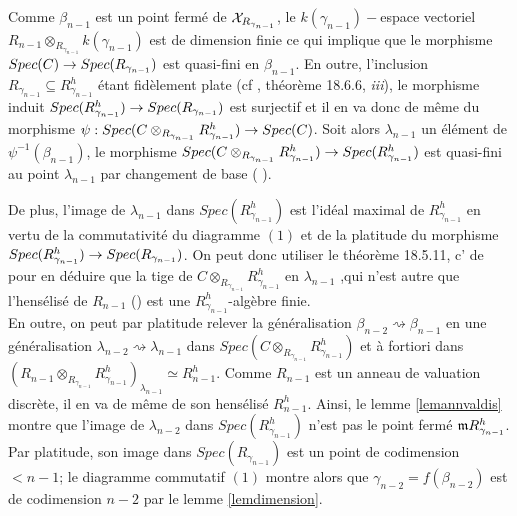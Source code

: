 \documentclass[11pt]{article}
\begin{document}
\begin{itemize}
Comme $\beta_{n-1}$ est un point fermé de $\mathcal{X}_{R_{\gamma_{n-1}}}$, le $k(\gamma_{n-1})-$espace vectoriel $R_{n-1} \otimes_{R_{\gamma_{n-1}}} k(\gamma_{n-1})$ est de dimension finie ce qui implique que le morphisme $Spec(C) \rightarrow Spec(R_{\gamma_{n-1}})$ est quasi-fini en $\beta_{n-1}$. En outre, l'inclusion $R_{\gamma_{n-1}} \subseteq R_{\gamma_{n-1}}^h$ étant fidèlement plate (cf \cite{PMIHES_1967__32__5_0}, théorème 18.6.6, \textit{iii}), le morphisme induit $Spec(R_{\gamma_{n-1}}^h) \rightarrow Spec(R_{\gamma_{n-1}})$ est surjectif et il en va donc de même du morphisme $\psi : Spec(C \otimes_{R_{\gamma_{n-1}}} R_{\gamma_{n-1}}^h) \rightarrow Spec(C)$. Soit alors $\lambda_{n-1}$ un élément de $\psi^{-1}(\beta_{n-1})$, le morphisme $Spec(C \otimes_{R_{\gamma_{n-1}}} R_{\gamma_{n-1}}^h) \rightarrow Spec(R_{\gamma_{n-1}}^h)$ est quasi-fini au point $\lambda_{n-1}$ par changement de base ( \cite[\href{https://stacks.math.columbia.edu/tag/00PP}{Tag 00PP}]{stacks-project}).

De plus, l'image de $\lambda_{n-1}$ dans $Spec(R_{\gamma_{n-1}}^h)$ est l'idéal maximal de $R_{\gamma_{n-1}}^h $ en vertu de la commutativité du diagramme $(1)$ et de la platitude du morphisme $Spec(R_{\gamma_{n-1}}^h) \rightarrow Spec(R_{\gamma_{n-1}})$. On peut donc utiliser le théorème 18.5.11, c' de \cite{PMIHES_1967__32__5_0} pour en déduire que la tige de $C \otimes_{R_{\gamma_{n-1}}} R_{\gamma_{n-1}}^h$ en $\lambda_{n-1}$ ,qui n'est autre que l'hensélisé de $R_{n-1}$ 
(\cite[\href{https://stacks.math.columbia.edu/tag/05WP}{Tag 05WP}]{stacks-project}) est une $R_{\gamma_{n-1}}^h$-algèbre finie.\\

En outre, on peut par platitude relever la généralisation $\beta_{n-2} \rightsquigarrow \beta_{n-1}$ en une généralisation $\lambda_{n-2} \rightsquigarrow \lambda_{n-1}$ dans $Spec(C \otimes_{R_{\gamma_{n-1}}} R_{\gamma_{n-1}}^h)$ et à fortiori dans $(R_{n-1} \otimes_{R_{\gamma_{n-1}}} R_{\gamma_{n-1}}^h)_{\lambda_{n-1}} \simeq R_{n-1}^h$. Comme $R_{n-1}$ est un anneau de valuation discrète, il en va de même de son hensélisé $R_{n-1}^h$. Ainsi, le lemme \ref{lemannvaldis} montre que l'image de $\lambda_{n-2}$ dans $Spec(R_{\gamma_{n-1}}^h)$ n'est pas le point fermé $\mathfrak{m} R_{\gamma_{n-1}}^h$. Par platitude, son image dans $Spec(R_{\gamma_{n-1}})$ est un point de codimension $< n-1$; le diagramme commutatif $(1)$ montre alors que $\gamma_{n-2} = f(\beta_{n-2})$ est de codimension $n-2$ par le lemme \ref{lemdimension}.
\end{itemize}
\end{document}
